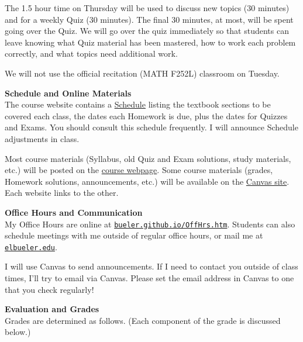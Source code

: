 \documentclass[12pt]{article}
\renewcommand{\emph}[1]{\textsf{\textbf{#1}}}
\newcommand{\localhead}[1]{\par\smallskip\textbf{#1} \smallskip\nobreak\\}%
\def\heading#1{\localhead{\large\emph{#1}}}
\begin{document}
The 1.5 hour time on Thursday will be used to discuss new topics (30 minutes) and for a weekly Quiz (30 minutes).  The final 30 minutes, at most, will be spent going over the Quiz.  We will go over the quiz immediately so that students can leave knowing what Quiz material has been mastered, how to work each problem correctly, and what topics need additional work.

We will not use the official recitation (MATH F252L) classroom on Tuesday.

\clearpage\newpage

\strut

\vspace{-12pt}

\heading{Schedule and Online Materials}
The course website contains a \href{https://uaf-math251.github.io/calc2/assets/general/S24/Bueler/schedule.pdf}{Schedule} listing the textbook sections to be covered each class, the dates each Homework is due, plus the dates for Quizzes and Exams. You should consult this schedule frequently.  I will announce Schedule adjustments in class.

Most course materials (Syllabus, old Quiz and Exam solutions, study materials, etc.) will be posted on the \href{https://uaf-math251.github.io/calc2/}{course webpage}.  Some course materials (grades, Homework solutions, announcements, etc.) will be available on the \href{https://canvas.alaska.edu/courses/18805}{Canvas site}.  Each website links to the other.


\heading{Office Hours and Communication}
My Office Hours are online at \href{http://bueler.github.io/OffHrs.htm}{\texttt{bueler.github.io/OffHrs.htm}}.  Students can also schedule meetings with me outside of regular office hours, or mail me at \href{mailto:elbueler@alaska.edu}{\texttt{elbueler\@@alaska.edu}}.

I will use Canvas to send announcements.  If I need to contact you outside of class times, I'll try to email via Canvas.  Please set the email address in Canvas to one that you check regularly!


\heading{Evaluation and Grades}
Grades are determined as follows.  (Each component of the grade is discussed below.)
 
\end{document}
